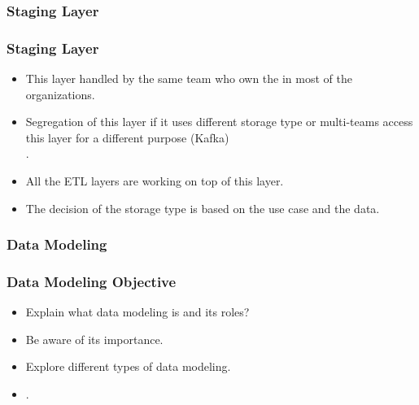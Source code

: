
\subsubsection{Staging Layer}
\begin{frame}
    \frametitle{Staging Layer}
    \begin{itemize}[<+->]
        \item This layer handled by the same team who own the  in most of the organizations.
        \item Segregation of this layer if it uses different storage type or multi-teams access this layer for a different purpose \forexample (Kafka)\\ .
        \item All the ETL layers are working on top of this layer.
        \item The decision of the storage type is based on the use case and the data.

    \end{itemize}

\end{frame}
\VideoClassification[column=2, colour=red]
\VideoClassification[column=1, colour=red]
\subsubsection{Data Modeling}


\begin{frame}
    \frametitle{Data Modeling Objective}
    \begin{itemize}[<+->]
        \item Explain what data modeling is and its roles?
        \item Be aware of its importance.
        \item Explore different types of data modeling.
        \item {}.
    \end{itemize}

\end{frame}

